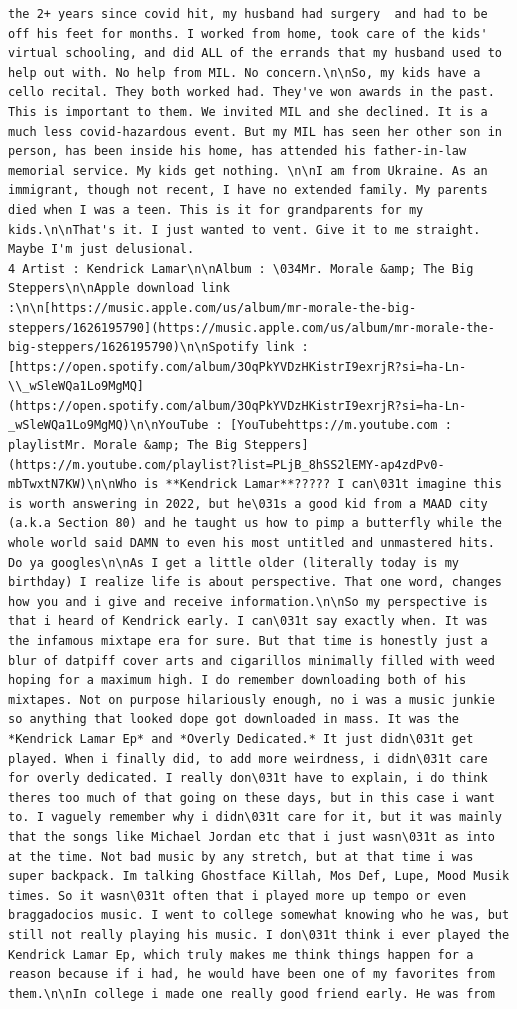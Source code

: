 \documentclass[
  letterpaper,
  DIV=11,
  numbers=noendperiod]{scrreprt}
\begin{document}
\begin{verbatim}
the 2+ years since covid hit, my husband had surgery  and had to be off his feet for months. I worked from home, took care of the kids' virtual schooling, and did ALL of the errands that my husband used to help out with. No help from MIL. No concern.\n\nSo, my kids have a cello recital. They both worked had. They've won awards in the past. This is important to them. We invited MIL and she declined. It is a much less covid-hazardous event. But my MIL has seen her other son in person, has been inside his home, has attended his father-in-law memorial service. My kids get nothing. \n\nI am from Ukraine. As an immigrant, though not recent, I have no extended family. My parents died when I was a teen. This is it for grandparents for my kids.\n\nThat's it. I just wanted to vent. Give it to me straight. Maybe I'm just delusional.
4 Artist : Kendrick Lamar\n\nAlbum : \034Mr. Morale &amp; The Big Steppers\n\nApple download link :\n\n[https://music.apple.com/us/album/mr-morale-the-big-steppers/1626195790](https://music.apple.com/us/album/mr-morale-the-big-steppers/1626195790)\n\nSpotify link : [https://open.spotify.com/album/3OqPkYVDzHKistrI9exrjR?si=ha-Ln-\\_wSleWQa1Lo9MgMQ](https://open.spotify.com/album/3OqPkYVDzHKistrI9exrjR?si=ha-Ln-_wSleWQa1Lo9MgMQ)\n\nYouTube : [YouTubehttps://m.youtube.com : playlistMr. Morale &amp; The Big Steppers](https://m.youtube.com/playlist?list=PLjB_8hSS2lEMY-ap4zdPv0-mbTwxtN7KW)\n\nWho is **Kendrick Lamar**????? I can\031t imagine this is worth answering in 2022, but he\031s a good kid from a MAAD city (a.k.a Section 80) and he taught us how to pimp a butterfly while the whole world said DAMN to even his most untitled and unmastered hits. Do ya googles\n\nAs I get a little older (literally today is my birthday) I realize life is about perspective. That one word, changes how you and i give and receive information.\n\nSo my perspective is that i heard of Kendrick early. I can\031t say exactly when. It was the infamous mixtape era for sure. But that time is honestly just a blur of datpiff cover arts and cigarillos minimally filled with weed hoping for a maximum high. I do remember downloading both of his mixtapes. Not on purpose hilariously enough, no i was a music junkie so anything that looked dope got downloaded in mass. It was the *Kendrick Lamar Ep* and *Overly Dedicated.* It just didn\031t get played. When i finally did, to add more weirdness, i didn\031t care for overly dedicated. I really don\031t have to explain, i do think theres too much of that going on these days, but in this case i want to. I vaguely remember why i didn\031t care for it, but it was mainly that the songs like Michael Jordan etc that i just wasn\031t as into at the time. Not bad music by any stretch, but at that time i was super backpack. Im talking Ghostface Killah, Mos Def, Lupe, Mood Musik times. So it wasn\031t often that i played more up tempo or even braggadocios music. I went to college somewhat knowing who he was, but still not really playing his music. I don\031t think i ever played the Kendrick Lamar Ep, which truly makes me think things happen for a reason because if i had, he would have been one of my favorites from them.\n\nIn college i made one really good friend early. He was from 
\end{verbatim}
\end{document}
